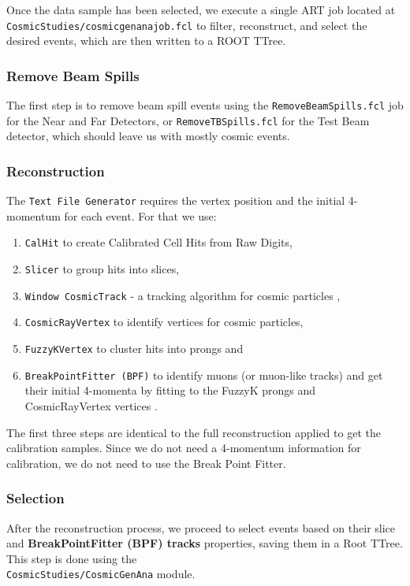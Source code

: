 \documentclass[12pt]{article}
\begin{document}
Once the data sample has been selected, we execute a single ART job located at \newline \texttt{CosmicStudies/cosmicgenanajob.fcl} to filter, reconstruct, and select the desired events, which are then written to a ROOT TTree.

\subsubsection{Remove Beam Spills}
The first step is to remove beam spill events using the \texttt{RemoveBeamSpills.fcl} job for the Near and Far Detectors, or \texttt{RemoveTBSpills.fcl} for the Test Beam detector, which should leave us with mostly cosmic events.

\subsubsection{Reconstruction}
The \texttt{Text File Generator} requires the vertex position and the initial 4-momentum for each event. For that we use:
\begin{enumerate}
\item \texttt{CalHit} to create Calibrated Cell Hits from Raw Digits,
\item \texttt{Slicer} to group hits into slices,
\item \texttt{Window CosmicTrack} - a tracking algorithm for cosmic particles \cite{NOVA-doc-15977-v1},
\item \texttt{CosmicRayVertex} to identify vertices for cosmic particles,
\item \texttt{FuzzyKVertex} to cluster hits into prongs and
\item \texttt{BreakPointFitter (BPF)} to identify muons (or muon-like tracks) and get their initial 4-momenta by fitting to the FuzzyK prongs and CosmicRayVertex vertices \cite{NOVA-doc-32455-v1}.
\end{enumerate}
The first three steps are identical to the full reconstruction applied to get the calibration samples. Since we do not need a 4-momentum information for calibration, we do not need to use the Break Point Fitter.

\subsubsection{Selection}
After the reconstruction process, we proceed to select events based on their slice and \textbf{BreakPointFitter (BPF) tracks} properties, saving them in a Root TTree. This step is done using the\\ \texttt{CosmicStudies/CosmicGenAna} module.
\end{document}
